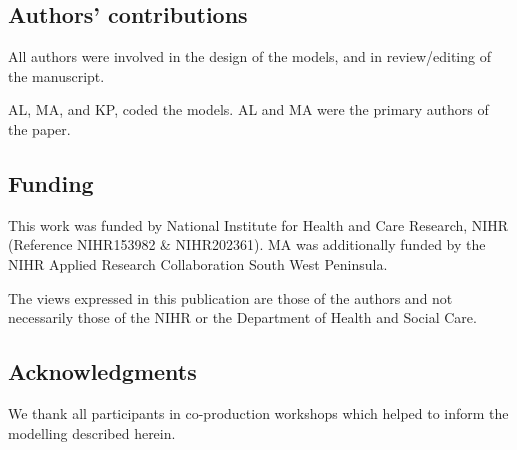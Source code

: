\subsection{Authors' contributions}

All authors were involved in the design of the models, and in review/editing of the manuscript.

AL, MA, and KP, coded the models. AL and MA were the primary authors of the paper.


\subsection*{Funding}

This work was funded by National Institute for Health and Care Research, NIHR (Reference NIHR153982 \& NIHR202361). MA was additionally funded by the NIHR Applied Research Collaboration South West Peninsula.

The views expressed in this publication are those of the authors and not necessarily those
of the NIHR or the Department of Health and Social Care.

\subsection*{Acknowledgments}

We thank all participants in co-production workshops which helped to inform the modelling described herein.

